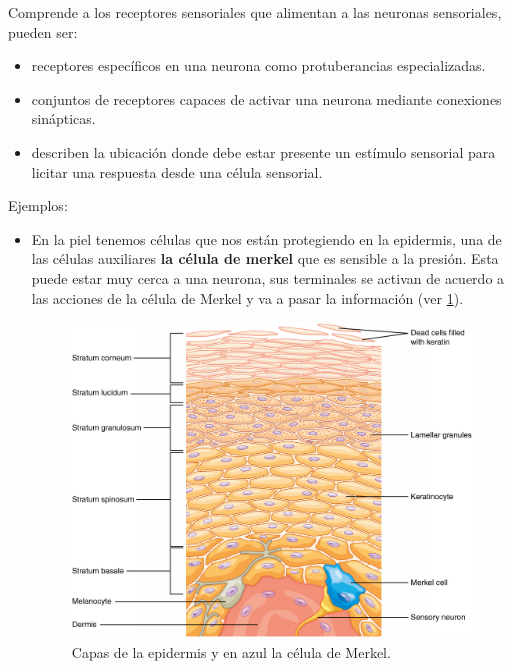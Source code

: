 Comprende a los receptores sensoriales que alimentan a las neuronas sensoriales, pueden ser:

\begin{itemize}
\item receptores específicos en una neurona como protuberancias especializadas. 
\item conjuntos de receptores capaces de activar una neurona mediante conexiones sinápticas. 
\item describen la ubicación donde debe estar presente un estímulo sensorial para licitar una respuesta desde una célula sensorial. 
\end{itemize}

Ejemplos:

\begin{itemize}
\item En la piel tenemos células que nos están protegiendo en la epidermis, una de las células auxiliares \textbf{la célula de merkel} que es
sensible a la presión. Esta puede estar muy cerca a una neurona, sus terminales se activan de acuerdo a las acciones de la célula de Merkel y va a pasar la información (ver \ref{fig:mer}).  
 	
\begin{figure}[h]
 \centering
 \includegraphics[scale=0.2]{../Figuras/merkel.png}
 \caption{Capas de la epidermis y en azul la célula de Merkel.}
 \label{fig:mer}
\end{figure}


\end{itemize}
